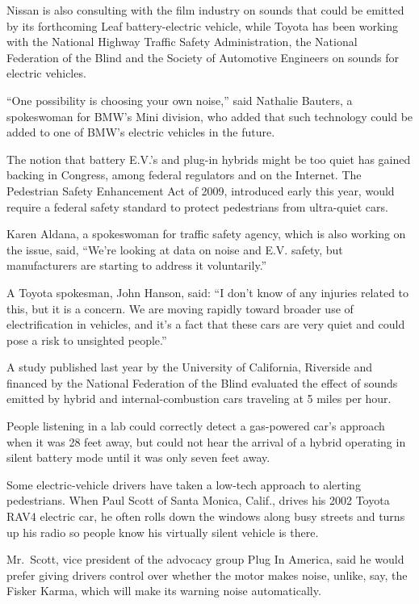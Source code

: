 ﻿\documentclass[12pt]{article}
\begin{document}
Nissan is also consulting with the film industry on sounds that could be emitted by its forthcoming
Leaf battery-electric vehicle, while Toyota has been working with the National Highway Traffic
Safety Administration, the National Federation of the Blind and the Society of Automotive Engineers
on sounds for electric vehicles.

``One possibility is choosing your own noise,'' said Nathalie Bauters, a spokeswoman for BMW's Mini
division, who added that such technology could be added to one of BMW's electric vehicles in the
future.

The notion that battery E.V.'s and plug-in hybrids might be too quiet has gained backing in
Congress, among federal regulators and on the Internet. The Pedestrian Safety Enhancement Act of
2009, introduced early this year, would require a federal safety standard to protect pedestrians
from ultra-quiet cars.

Karen Aldana, a spokeswoman for traffic safety agency, which is also working on the issue, said,
``We're looking at data on noise and E.V. safety, but manufacturers are starting to address it
voluntarily.''

A Toyota spokesman, John Hanson, said: ``I don't know of any injuries related to this, but it is a
concern. We are moving rapidly toward broader use of electrification in vehicles, and it's a fact
that these cars are very quiet and could pose a risk to unsighted people.''

A study published last year by the University of California, Riverside and financed by the National
Federation of the Blind evaluated the effect of sounds emitted by hybrid and internal-combustion
cars traveling at 5 miles per hour.

People listening in a lab could correctly detect a gas-powered car's approach when it was 28 feet
away, but could not hear the arrival of a hybrid operating in silent battery mode until it was only
seven feet away.

Some electric-vehicle drivers have taken a low-tech approach to alerting pedestrians. When Paul
Scott of Santa Monica, Calif., drives his 2002 Toyota RAV4 electric car, he often rolls down the
windows along busy streets and turns up his radio so people know his virtually silent vehicle is
there.

Mr.~Scott, vice president of the advocacy group Plug In America, said he would prefer giving drivers
control over whether the motor makes noise, unlike, say, the Fisker Karma, which will make its
warning noise automatically.
\end{document}
